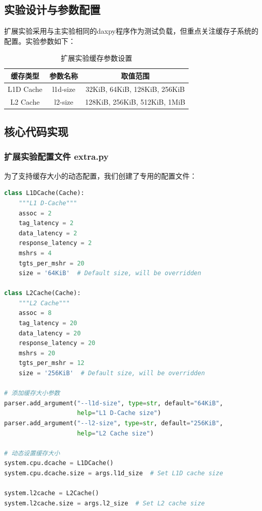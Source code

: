 \documentclass[a4paper]{article}
\begin{document}
\subsection{实验设计与参数配置}

扩展实验采用与主实验相同的daxpy程序作为测试负载，但重点关注缓存子系统的配置。实验参数如下：

\begin{table}[htbp]
    \centering
    \caption{扩展实验缓存参数设置}
    \begin{tabular}{|c|c|c|}
        \hline
        \textbf{缓存类型} & \textbf{参数名称} & \textbf{取值范围} \\
        \hline
        L1D Cache & l1d-size & 32KiB, 64KiB, 128KiB, 256KiB \\
        \hline
        L2 Cache & l2-size & 128KiB, 256KiB, 512KiB, 1MiB \\
        \hline
    \end{tabular}
\end{table}

\subsection{核心代码实现}

\subsubsection{扩展实验配置文件 extra.py}

为了支持缓存大小的动态配置，我们创建了专用的配置文件：

\begin{lstlisting}[language=python, caption=extra.py核心代码片段]
class L1DCache(Cache):
    """L1 D-Cache"""
    assoc = 2
    tag_latency = 2
    data_latency = 2
    response_latency = 2
    mshrs = 4
    tgts_per_mshr = 20
    size = '64KiB'  # Default size, will be overridden

class L2Cache(Cache):
    """L2 Cache"""
    assoc = 8
    tag_latency = 20
    data_latency = 20
    response_latency = 20
    mshrs = 20
    tgts_per_mshr = 12
    size = '256KiB'  # Default size, will be overridden

# 添加缓存大小参数
parser.add_argument("--l1d-size", type=str, default="64KiB", 
                    help="L1 D-Cache size")
parser.add_argument("--l2-size", type=str, default="256KiB", 
                    help="L2 Cache size")

# 动态设置缓存大小
system.cpu.dcache = L1DCache()
system.cpu.dcache.size = args.l1d_size  # Set L1D cache size

system.l2cache = L2Cache()
system.l2cache.size = args.l2_size  # Set L2 cache size
\end{lstlisting}
\end{document}
